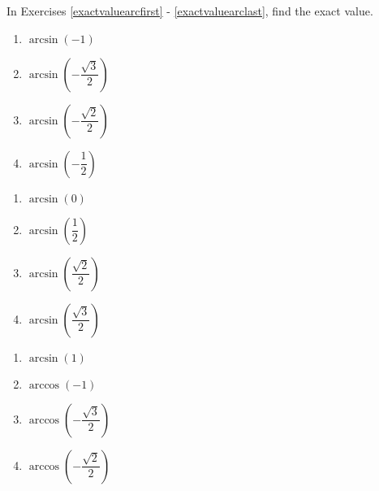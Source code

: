 \documentclass{ximera}
\begin{document}
	\author{Stitz-Zeager}


In Exercises \ref{exactvaluearcfirst} - \ref{exactvaluearclast}, find the exact value.

\begin{multicols}{4} 

\begin{enumerate}

\item $\arcsin \left( -1 \right)$  \label{exactvaluearcfirst}
\item $\arcsin \left( -\dfrac{\sqrt{3}}{2} \right)$
\item $\arcsin \left( -\dfrac{\sqrt{2}}{2} \right)$
\item $\arcsin \left( -\dfrac{1}{2} \right)$ 

\setcounter{HW}{\value{enumi}}

\end{enumerate}

\end{multicols}

\begin{multicols}{4}

\begin{enumerate}

\setcounter{enumi}{\value{HW}}

\item $\arcsin \left( 0 \right)$ 
\item $\arcsin \left( \dfrac{1}{2} \right)$ 
\item $\arcsin \left( \dfrac{\sqrt{2}}{2} \right)$
\item $\arcsin \left( \dfrac{\sqrt{3}}{2} \right)$

\setcounter{HW}{\value{enumi}}

\end{enumerate}

\end{multicols}

\begin{multicols}{4}

\begin{enumerate}

\setcounter{enumi}{\value{HW}}

\item $\arcsin \left( 1 \right)$ 
\item $\arccos \left( -1 \right)$ 
\item $\arccos \left( -\dfrac{\sqrt{3}}{2} \right)$
\item $\arccos \left( -\dfrac{\sqrt{2}}{2} \right)$

\setcounter{HW}{\value{enumi}}

\end{enumerate}

\end{multicols}
\end{document}
